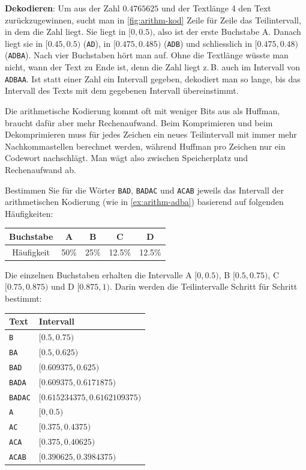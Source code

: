 \begin{myexample}
\textbf{Dekodieren}: Um aus der Zahl $0.4765625$ und der Textlänge 4 den Text zurückzugewinnen, sucht man in \cref{fig:arithm-kod} Zeile für Zeile das Teilintervall, in dem die Zahl liegt. Sie liegt in $[0, 0.5)$, also ist der erste Buchstabe A. Danach liegt sie in $[0.45, 0.5)$ (\texttt{AD}), in $[0.475, 0.485)$ (\texttt{ADB}) und schliesslich in $[0.475, 0.48)$ (\texttt{ADBA}). Nach vier Buchstaben hört man auf. Ohne die Textlänge wüsste man nicht, wann der Text zu Ende ist, denn die Zahl liegt z.\,B. auch im Intervall von \texttt{ADBAA}. Ist statt einer Zahl ein Intervall gegeben, dekodiert man so lange, bis das Intervall des Texts mit dem gegebenen Intervall übereinstimmt.
\end{myexample}

Die arithmetische Kodierung kommt oft mit weniger Bits aus als Huffman, braucht dafür aber mehr Rechenaufwand. Beim Komprimieren und beim Dekomprimieren muss für jedes Zeichen ein neues Teilintervall mit immer mehr Nachkommastellen berechnet werden, während Huffman pro Zeichen nur ein Codewort nachschlägt. Man wägt also zwischen Speicherplatz und Rechenaufwand ab.

\begin{myexercise}
	Bestimmen Sie für die Wörter \texttt{BAD}, \texttt{BADAC} und \texttt{ACAB} jeweils das Intervall der arithmetischen Kodierung (wie in \cref{ex:arithm-adba}) basierend auf folgenden Häufigkeiten:
	\begin{table}[H]
		\centering
		\begin{tabular}{ccccc}
			Buchstabe  & A    & B    & C      & D      \\\midrule
			Häufigkeit & 50\% & 25\% & 12.5\% & 12.5\%
		\end{tabular}
	\end{table}
	\begin{myanswer}
		Die einzelnen Buchstaben erhalten die Intervalle A $[0, 0.5)$, B $[0.5, 0.75)$, C $[0.75, 0.875)$ und D $[0.875, 1)$. Darin werden die Teilintervalle Schritt für Schritt bestimmt:
		\begin{center}
			\begin{tabular}{ll}
				Text & Intervall \\\midrule
				\texttt{B} & $[0.5, 0.75)$ \\
				\texttt{BA} & $[0.5, 0.625)$ \\
				\texttt{BAD} & $[0.609375, 0.625)$ \\
				\texttt{BADA} & $[0.609375, 0.6171875)$ \\
				\texttt{BADAC} & $[0.615234375, 0.6162109375)$ \\
				\midrule
				\texttt{A} & $[0, 0.5)$ \\
				\texttt{AC} & $[0.375, 0.4375)$ \\
				\texttt{ACA} & $[0.375, 0.40625)$ \\
				\texttt{ACAB} & $[0.390625, 0.3984375)$
			\end{tabular}
		\end{center}
	\end{myanswer}
\end{myexercise}

